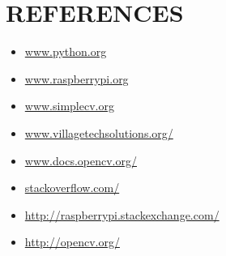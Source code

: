 \documentclass[12pt, a4paper]{article}
\begin{document}
\newpage

\section{REFERENCES}
\begin{itemize}
	\item \url{www.python.org}
	\item \url{www.raspberrypi.org}
	\item \url{www.simplecv.org}
	\item \url{www.villagetechsolutions.org/}
	\item \url{www.docs.opencv.org/}
	\item \url{stackoverflow.com/}
	\item \url{http://raspberrypi.stackexchange.com/}
	\item \url{http://opencv.org/}
\end{itemize}
\newpage
\appendix
\end{document}
